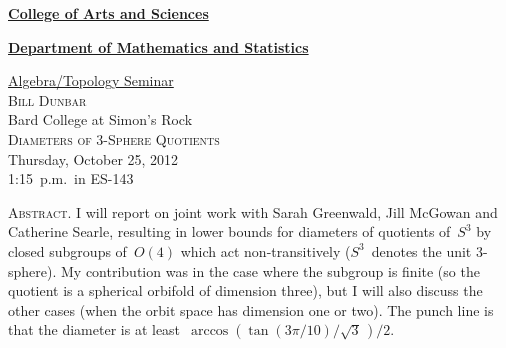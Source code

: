 \documentclass[12pt]{article}
\newcommand*{\Speaker}%
{Bill Dunbar}
\newcommand*{\Affiliation}%
{Bard College at Simon's Rock}
\newcommand*{\Title}%
{Diameters of 3-Sphere Quotients}
\newcommand*{\Date}%
{October 25, 2012}
\newcommand{\Abstract}%
{I will report on joint work with Sarah Greenwald, Jill McGowan and Catherine Searle, resulting in lower bounds for diameters of quotients of~$S^3$ by closed subgroups of~$O(4)$ which act non-transitively ($S^3$~denotes the unit 3-sphere).  My contribution was in the case where the subgroup is finite (so the quotient is a spherical orbifold of dimension three), but I will also discuss the other cases (when the orbit space has dimension one or two).  The punch line is that the diameter is at least~$\arccos\left(\tan(3\pi/10)/\sqrt{3}\,\right)\!/2$.}
\begin{document}
\noindent\hspace{-27pt}\raisebox{-19pt}{\XeTeXpicfile UAlogo.png scaled 610}
\hfill\textsf{\textbf{\footnotesize\href{http://www.albany.edu/cas/}{College of Arts and Sciences}}}\par
\vspace{-11pt}\hfill\textsf{\textbf{\footnotesize\href{http://www.albany.edu/math/}{Department of Mathematics and Statistics}}}\bigskip\bigskip
\begin{center}\Large
\textsf{\huge\href{http://www.albany.edu/~mv312143/seminar/}{Algebra/Topology Seminar}}\\[2.5\bigskipamount]
\textsc{\LARGE\Speaker}\\
\Affiliation\\[1.5\bigskipamount]
\textsc{\LARGE\Title}\\[2\bigskipamount]
Thursday, \Date\\
1:15~p.m.\ in ES-143\\[3\bigskipamount]
\end{center}
\noindent\large\textsc{Abstract.}
\Abstract
\end{document}
